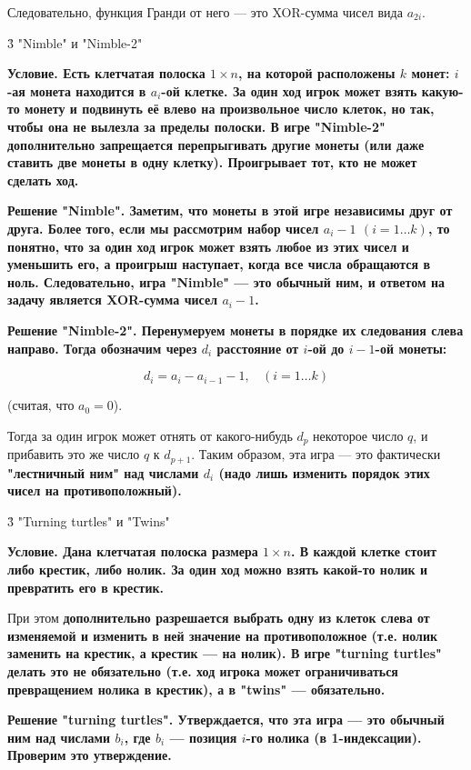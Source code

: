 Следовательно, функция Гранди от него --- это XOR-сумма чисел вида $a_{2i}$.


\h3{ "Nimble" и "Nimble-2" }

\bf{Условие}. Есть клетчатая полоска $1 \times n$, на которой расположены $k$ монет: $i$-ая монета находится в $a_i$-ой клетке. За один ход игрок может взять какую-то монету и подвинуть её влево на произвольное число клеток, но так, чтобы она не вылезла за пределы полоски. В игре "Nimble-2" дополнительно запрещается перепрыгивать другие монеты (или даже ставить две монеты в одну клетку). Проигрывает тот, кто не может сделать ход.

\bf{Решение "Nimble"}. Заметим, что монеты в этой игре независимы друг от друга. Более того, если мы рассмотрим набор чисел $a_i-1$ $(i = 1 \ldots k)$, то понятно, что за один ход игрок может взять любое из этих чисел и уменьшить его, а проигрыш наступает, когда все числа обращаются в ноль. Следовательно, игра "Nimble" --- это \bf{обычный ним}, и ответом на задачу является XOR-сумма чисел $a_i-1$.

\bf{Решение "Nimble-2"}. Перенумеруем монеты в порядке их следования слева направо. Тогда обозначим через $d_i$ расстояние от $i$-ой до $i-1$-ой монеты:

$$ d_i = a_i - a_{i-1} - 1, ~~~~ (i = 1 \ldots k) $$

(считая, что $a_0 = 0$).

Тогда за один игрок может отнять от какого-нибудь $d_p$ некоторое число $q$, и прибавить это же число $q$ к $d_{p+1}$. Таким образом, эта игра --- это фактически \bf{"лестничный ним"} над числами $d_i$ (надо лишь изменить порядок этих чисел на противоположный).


\h3{ "Turning turtles" и "Twins" }

\bf{Условие}. Дана клетчатая полоска размера $1 \times n$. В каждой клетке стоит либо крестик, либо нолик. За один ход можно взять какой-то нолик и превратить его в крестик.

При этом \bf{дополнительно} разрешается выбрать одну из клеток слева от изменяемой и изменить в ней значение на противоположное (т.е. нолик заменить на крестик, а крестик --- на нолик). В игре "turning turtles" делать это не обязательно (т.е. ход игрока может ограничиваться превращением нолика в крестик), а в "twins" --- обязательно.

\bf{Решение "turning turtles"}. Утверждается, что эта игра --- это обычный ним над числами $b_i$, где $b_i$ --- позиция $i$-го нолика (в 1-индексации). Проверим это утверждение.


